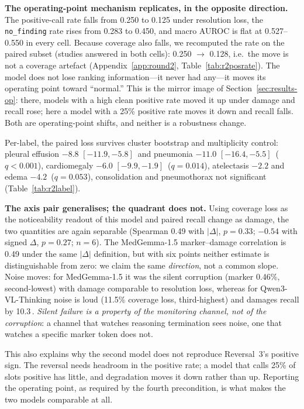 \textbf{The operating-point mechanism replicates, in the opposite direction.} The positive-call rate falls from 0.250 to 0.125 under resolution loss, the \texttt{no\_finding} rate rises from 0.283 to 0.450, and macro AUROC is flat at 0.527--0.550 in every cell. Because coverage also falls, we recomputed the rate on the paired subset (studies answered in both cells): 0.250 $\rightarrow$ 0.128, i.e.\ the move is not a coverage artefact (Appendix~\ref{app:round2}, Table~\ref{tab:r2posrate}). The model does not lose ranking information---it never had any---it moves its operating point toward ``normal.'' This is the mirror image of Section~\ref{sec:results-op}: there, models with a high clean positive rate moved it up under damage and recall rose; here a model with a 25\% positive rate moves it down and recall falls. Both are operating-point shifts, and neither is a robustness change.

Per-label, the paired loss survives cluster bootstrap and multiplicity control: pleural effusion $-8.8$ $[-11.9,-5.8]$\,\pp{} and pneumonia $-11.0$ $[-16.4,-5.5]$\,\pp{} ($q<0.001$), cardiomegaly $-6.0$ $[-9.9,-1.9]$\,\pp{} ($q=0.014$), atelectasis $-2.2$ and edema $-4.2$\,\pp{} ($q=0.053$), consolidation and pneumothorax not significant (Table~\ref{tab:r2label}).

\textbf{The axis pair generalises; the quadrant does not.} Using coverage loss as the noticeability readout of this model and paired recall change as damage, the two quantities are again separable (Spearman 0.49 with $|\Delta|$, $p=0.33$; $-0.54$ with signed $\Delta$, $p=0.27$; $n=6$). The MedGemma-1.5 marker--damage correlation is 0.49 under the same $|\Delta|$ definition, but with six points neither estimate is distinguishable from zero: we claim the same \emph{direction}, not a common slope. Noise moves: for MedGemma-1.5 it was the silent corruption (marker 0.46\%, second-lowest) with damage comparable to resolution loss, whereas for Qwen3-VL-Thinking noise is loud (11.5\% coverage loss, third-highest) and damages recall by 10.3\,\pp{}. \emph{Silent failure is a property of the monitoring channel, not of the corruption}: a channel that watches reasoning termination sees noise, one that watches a specific marker token does not.

This also explains why the second model does not reproduce Reversal~3's positive sign. The reversal needs headroom in the positive rate; a model that calls 25\% of slots positive has little, and degradation moves it down rather than up. Reporting the operating point, as required by the fourth precondition, is what makes the two models comparable at all.
